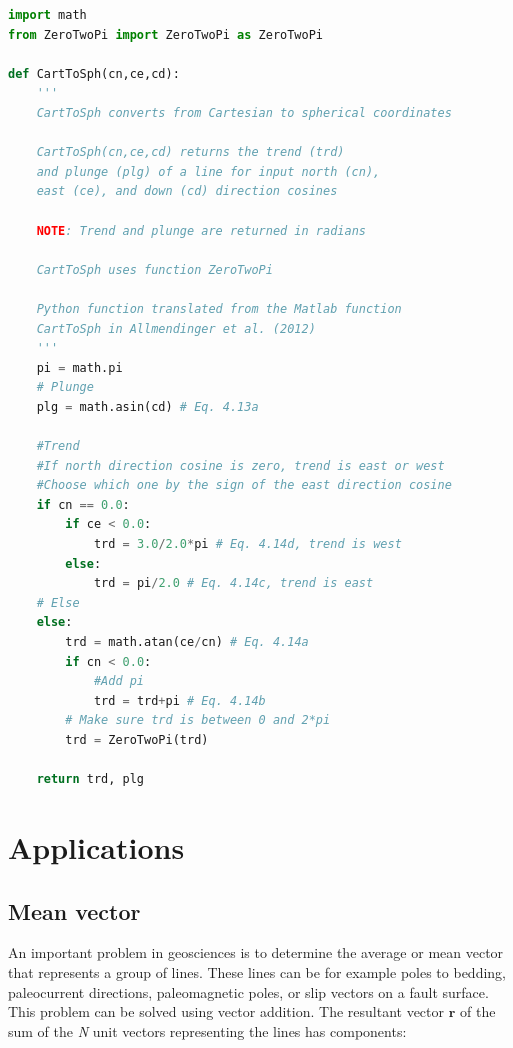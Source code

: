 \documentclass[a4paper , 12pt]{book}
\begin{document}
\begin{center}
\begin{lstlisting}[language=Python, frame=single]
import math
from ZeroTwoPi import ZeroTwoPi as ZeroTwoPi

def CartToSph(cn,ce,cd):
    '''
    CartToSph converts from Cartesian to spherical coordinates 

    CartToSph(cn,ce,cd) returns the trend (trd)
    and plunge (plg) of a line for input north (cn), 
    east (ce), and down (cd) direction cosines

    NOTE: Trend and plunge are returned in radians

    CartToSph uses function ZeroTwoPi
    
    Python function translated from the Matlab function 
    CartToSph in Allmendinger et al. (2012)
    '''
    pi = math.pi
    # Plunge 
    plg = math.asin(cd) # Eq. 4.13a
    
    #Trend
    #If north direction cosine is zero, trend is east or west
    #Choose which one by the sign of the east direction cosine
    if cn == 0.0:
        if ce < 0.0:
            trd = 3.0/2.0*pi # Eq. 4.14d, trend is west
        else:
            trd = pi/2.0 # Eq. 4.14c, trend is east
    # Else
    else:
        trd = math.atan(ce/cn) # Eq. 4.14a
        if cn < 0.0:
            #Add pi 
            trd = trd+pi # Eq. 4.14b
        # Make sure trd is between 0 and 2*pi
        trd = ZeroTwoPi(trd)
    
    return trd, plg
\end{lstlisting}    
\end{center}

\section{Applications}

\subsection{Mean vector}

An important problem in geosciences is to determine the average or mean vector that represents a group of lines. These lines can be for example poles to bedding, paleocurrent directions, paleomagnetic poles, or slip vectors on a fault surface. This problem can be solved using vector addition. The resultant vector $\mathbf{r}$ of the sum of the \textit{N} unit vectors representing the lines has components:
\end{document}
